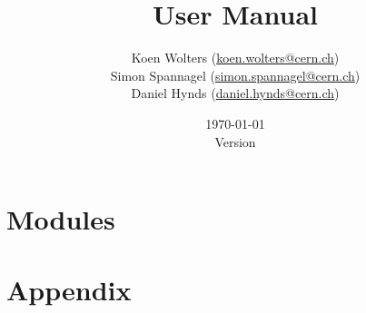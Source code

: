 \documentclass[fontsize=12pt, parskip=half]{scrartcl}
\title{\apsqbold User Manual} %
\author{Koen Wolters (\href{mailto:koen.wolters@cern.ch}{koen.wolters@cern.ch})\\
  Simon Spannagel (\href{mailto:simon.spannagel@cern.ch}{simon.spannagel@cern.ch})\\
  Daniel Hynds (\href{mailto:daniel.hynds@cern.ch}{daniel.hynds@cern.ch})
} %
\date{\today\\ \vspace{10pt} Version \version} %
\begin{document}
\begin{titlepage}
\maketitle %

\addlicense
\end{titlepage}

\clearpage
\tableofcontents

\clearpage


\clearpage


\clearpage


\clearpage


\clearpage


\clearpage


\clearpage

\section{Modules}
\label{sec:modules}

\lstset{language=Ini}
\lstset{language=}
\clearpage


\clearpage


\clearpage


\clearpage


\clearpage


\clearpage

\appendix
\section{Appendix}

% 

\clearpage
{}
\addreferencesline
\printbibliography
\end{document}
